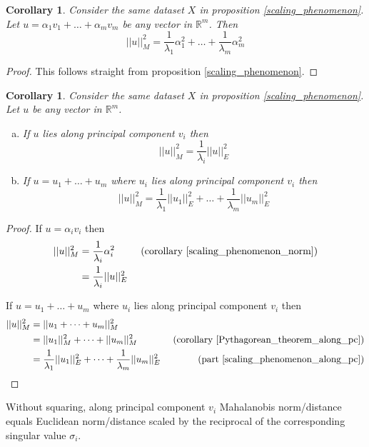 \documentclass[11pt]{amsart}
\newtheorem{corollary}[theorem]{Corollary}
\theoremstyle{definition}
\begin{document}
\begin{corollary} \label{scaling_phenomenon_norm} Consider the same dataset $X$ in proposition \ref{scaling_phenomenon}. Let $u = \alpha_1 v_1 + \dots + \alpha_m v_m$ be any vector in $\mathbb{R}^m$. Then
$$||u||_M^2 = \frac{1}{\lambda_1} \alpha_1^2 + \dots + \frac{1}{\lambda_m} \alpha_m^2$$
\end{corollary}
\begin{proof} This follows straight from proposition \ref{scaling_phenomenon}.
\end{proof}

\begin{corollary} \label{scaling_phenomenon_pc} Consider the same dataset $X$ in proposition \ref{scaling_phenomenon}. Let $u$ be any vector in $\mathbb{R}^m$.
\begin{enumerate}[a.]
\item \label{scaling_phenomenon_along_pc} If $u$ lies along principal component $v_i$ then
$$||u||_M^2 = \frac{1}{\lambda_i} ||u||_E^2$$
\item \label{scaling_phenomenon_off_pc} If $u = u_1 + \dots + u_m$ where $u_i$ lies along principal component $v_i$ then
$$||u||_M^2 = \frac{1}{\lambda_1} ||u_1||_E^2 + \dots + \frac{1}{\lambda_m} ||u_m||_E^2$$
\end{enumerate}
\end{corollary}
\begin{proof} If $u = \alpha_i v_i$ then
\begin{align*}
||u||_M^2 & = \frac{1}{\lambda_i} \alpha_i^2 & \text{ (corollary \ref{scaling_phenomenon_norm})} \\
 & = \frac{1}{\lambda_i} ||u||_E^2 & 
\end{align*}

If $u = u_1 + \dots + u_m$ where $u_i$ lies along principal component $v_i$ then
\begin{align*}
||u||_M^2 & = ||u_1 + \dots + u_m||_M^2 \\
 & = ||u_1||_M^2 + \dots + ||u_m||_M^2 & \text{ (corollary \ref{Pythagorean_theorem_along_pc})} \\
 & = \frac{1}{\lambda_1} ||u_1||_E^2 + \dots + \frac{1}{\lambda_m} ||u_m||_E^2 & \text{ (part \ref{scaling_phenomenon_along_pc})}
\end{align*}
\end{proof}

Without squaring, along principal component $v_i$ Mahalanobis norm/distance equals Euclidean norm/distance scaled by the reciprocal of the corresponding singular value $\sigma_i$.
\end{document}
